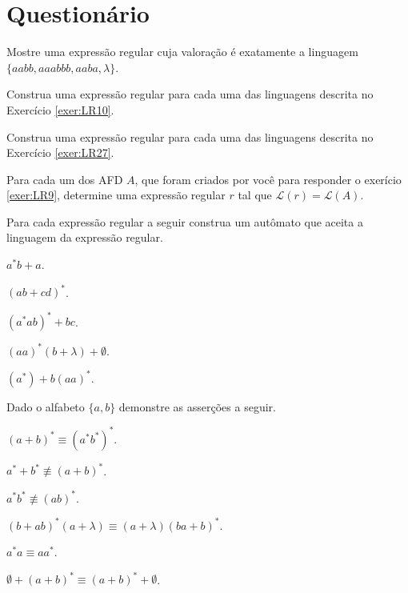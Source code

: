 \section{Questionário}\label{sec:Questionario3part4}


\begin{questao}\label{exer:EGR35}
	Mostre uma expressão regular cuja valoração é exatamente a linguagem $\{aabb, aaabbb, aaba, \lambda\}$. 
\end{questao}

\begin{questao}\label{exer:EGR36}
	Construa uma expressão regular para cada uma das linguagens descrita no Exercício \ref{exer:LR10}.
\end{questao}

\begin{questao}\label{exer:EGR37}
	Construa uma expressão regular para cada uma das linguagens descrita no Exercício \ref{exer:LR27}.
\end{questao}

\begin{questao}\label{exer:EGR38}
	Para cada um dos AFD $A$, que foram criados por você para responder o exerício \ref{exer:LR9}, determine uma expressão regular $r$ tal que $\mathcal{L}(r) = \mathcal{L}(A)$.
\end{questao}

\begin{questao}\label{exer:EGR39}
	Para cada expressão regular a seguir construa um autômato que aceita a linguagem da expressão regular.
\end{questao}

\begin{exerList}
	\item $a^*b + a$.
	\item $(ab + cd)^*$.
	\item $(a^*ab)^* + bc$.
	\item $(aa)^* (b + \lambda) + \emptyset$.
	\item $(a^*) + b(aa)^*$.
\end{exerList}

\begin{questao}\label{exer:EGR40}
	Dado o alfabeto $\{a, b\}$ demonstre as asserções a seguir.
\end{questao}

\begin{exerList}
	\item $(a + b)^* \equiv (a^*b^*)^*$.
	\item $a^* + b^* \not\equiv (a + b)^*$.
	\item $a^*b^* \not\equiv (ab)^*$.
	\item $(b + ab)^* (a + \lambda) \equiv (a + \lambda)(ba + b)^*$.
	\item $a^*a \equiv aa^*$.
	\item $\emptyset + (a + b)^* \equiv (a + b)^* + \emptyset$.
\end{exerList}


